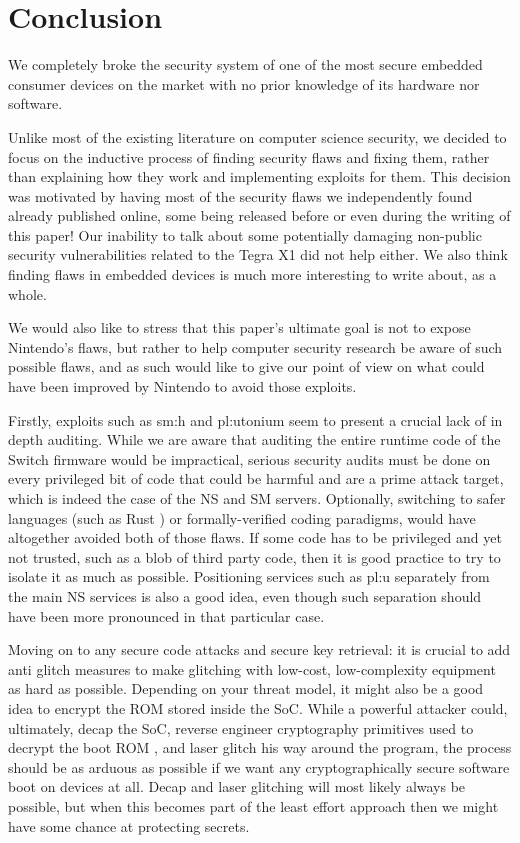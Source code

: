 \documentclass[journal]{IEEEtran}
\begin{document}
\section{Conclusion}
We completely broke the security system of one of the most secure embedded 
consumer devices on the market with no prior knowledge of its hardware nor
software.   

Unlike most of the existing literature on computer science security, we decided to focus on the 
inductive process of finding security flaws and fixing them, rather than explaining how they work
and implementing exploits for them. This decision was motivated by having most of the security
flaws we independently found already published online, some being released before or even
during \cite{8.0.0} the writing of this paper! Our inability to talk about some potentially
damaging non-public security vulnerabilities related to the Tegra X1 did not help either.
We also think finding flaws in embedded devices is much more interesting to write about,
as a whole. 

We would also like to stress that this paper's ultimate goal is not to expose Nintendo's flaws,
but rather to help computer security research be aware of such possible flaws, and as such would
like to give our point of view on what could have been improved by Nintendo to avoid those exploits.

Firstly, exploits such as sm:h and pl:utonium seem to present a crucial lack of
in depth auditing.
While we are aware that auditing the entire runtime code of the Switch firmware
would be impractical, serious security audits must be done on every privileged
bit of code that could be harmful and are a prime attack target, which is indeed the 
case of the NS and SM servers. Optionally, switching to safer languages (such as Rust
\cite{rust}) or formally-verified coding paradigms, would have altogether avoided both of those
flaws.  If some code has to be privileged and yet not trusted, such as a blob of third
party code, then it is good practice to try to isolate it as much as possible. Positioning
services such as pl:u separately from the main NS services is also a good idea, even
though such separation should have been more pronounced in that particular case.

Moving on to any secure code attacks and secure key retrieval: it is crucial to add anti glitch
measures to make glitching with low-cost, low-complexity equipment as hard as possible.
Depending on your threat model, it might also be a good idea to encrypt the ROM stored inside the
SoC. While a powerful attacker could, ultimately, decap the SoC, reverse engineer
cryptography primitives used to decrypt the boot ROM \cite{tv_hack}, and laser glitch his way
around the program, the process should be as arduous as possible if we want any cryptographically
secure software boot on devices at all. Decap and laser glitching will most likely always be
possible, but when this becomes part of the least effort approach then we might have some chance at
protecting secrets.
\end{document}
